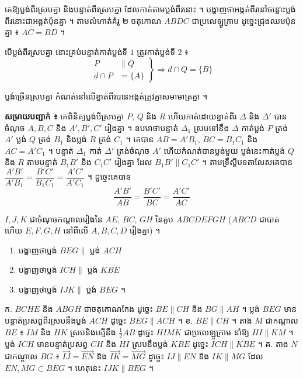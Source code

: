\begin{pro}
គេឱ្យប្លង់ពីរស្របគ្នា និងបន្ទាត់ពីរស្របគ្នា ដែលកាត់តាមប្លង់ពីរនោះ ។ បង្ហាញថាអង្កត់ពីរនៅចន្លោះប្លង់ពីរនោះជាអង្កត់ប៉ុនគ្នា ។
\ans
តាមលំហាត់គំរូ ២ ចតុកោណ $ABDC$ ជាប្រលេឡូក្រាម ដូច្នេះជ្រុងឈមប៉ុនគ្នា ៖ $AC = BD$ ។
\end{pro}

\begin{theorem}[លក្ខណៈទី ៤]
បើប្លង់ពីរស្របគ្នា នោះគ្រប់បន្ទាត់កាត់ប្លង់ទី $1$ ត្រូវកាត់ប្លង់ទី $2$ ៖
\[
\left.\begin{aligned} P &\parallel Q\\ d \cap P &= \{A\} \end{aligned}\right\} \Rightarrow d \cap Q = \{B\}
\]
\end{theorem}

\begin{theorem}[លក្ខណៈទី ៥]
ប្លង់ច្រើនស្របគ្នា កំណត់នៅលើខ្នាត់ពីរបានអង្កត់ត្រូវគ្នាសមាមាត្រគ្នា ។
\end{theorem}
\textbf{សម្រាយបញ្ជាក់ ៖} គេពិនិត្យប្លង់បីស្របគ្នា $P$, $Q$ និង $R$ ហើយកាត់ដោយខ្នាត់ពីរ $\Delta$ និង $\Delta'$ បានចំណុច $A, B, C$ និង $A', B', C'$ រៀងគ្នា ។ ឧបមាថាបន្ទាត់ $\Delta_1$ ស្របទៅនឹង $\Delta$ កាត់ប្លង់ $P$ ត្រង់ $A'$ ប្លង់ $Q$ ត្រង់ $B_1$ និងប្លង់ $R$ ត្រង់ $C_1$ ។ គេបាន $AB = A'B_1$, $BC = B_1C_1$ និង $AC = A'C_1$ ។ បន្ទាត់ $\Delta_1$ កាត់ $\Delta'$ ត្រង់ចំណុច $A'$ ហើយកំណត់បានប្លង់មួយ ប្លង់នេះកាត់ប្លង់ $Q$ និង $R$ តាមបន្ទាត់ $B_1B'$ និង $C_1C'$ រៀងគ្នា ដែល $B_1B' \parallel C_1C'$ ។ តាមទ្រឹស្ដីបទតាលែសគេបាន $\dfrac{A'B'}{A'B_1} = \dfrac{B'C'}{B_1C_1} = \dfrac{A'C'}{A'C_1}$ ។ ដូច្នេះគេបាន
\[
\frac{A'B'}{AB} = \frac{B'C'}{BC} = \frac{A'C'}{AC}
\]

\begin{pro}
$I, J, K$ ជាចំណុចកណ្ដាលរៀងនៃ $AE$, $BC$, $GH$ នៃគូប $ABCDEFGH$ ($ABCD$ ជាបាត ហើយ $E, F, G, H$ នៅពីលើ $A, B, C, D$ រៀងគ្នា) ។
\begin{enumerate}[a]
  \item បង្ហាញថាប្លង់ $BEG \parallel$ ប្លង់ $ACH$
  \item បង្ហាញថាប្លង់ $ICH \parallel$ ប្លង់ $KBE$
  \item បង្ហាញថាប្លង់ $IJK \parallel$ ប្លង់ $BEG$ ។
\end{enumerate}
\ans
ក. $BCHE$ និង $ABGH$ ជាចតុកោណកែង ដូច្នេះ $BE \parallel CH$ និង $BG \parallel AH$ ។ ប្លង់ $BEG$ មានបន្ទាត់ប្រសព្វពីរស្របនឹងប្លង់ $ACH$ ដូច្នេះ $BEG \parallel ACH$ ។ \quad ខ. $BE \parallel CH$ ។ តាង $M$ ជាកណ្ដាល $BE$ ៖ $IM$ និង $HK$ ស្របនិងស្មើនឹង $\tfrac{1}{2}AB$ ដូច្នេះ $HIMK$ ជាប្រលេឡូក្រាម នាំឱ្យ $HI \parallel KM$ ។ ប្លង់ $ICH$ មានបន្ទាត់ប្រសព្វ $CH$ និង $HI$ ស្របនឹងប្លង់ $KBE$ ដូច្នេះ $ICH \parallel KBE$ ។ \quad គ. តាង $N$ ជាកណ្ដាល $BG$ ៖ $\overrightarrow{IJ} = \overrightarrow{EN}$ និង $\overrightarrow{IK} = \overrightarrow{MG}$ ដូច្នេះ $IJ \parallel EN$ និង $IK \parallel MG$ ដែល $EN, MG \subset BEG$ ។ ហេតុនេះ $IJK \parallel BEG$ ។
\end{pro}


